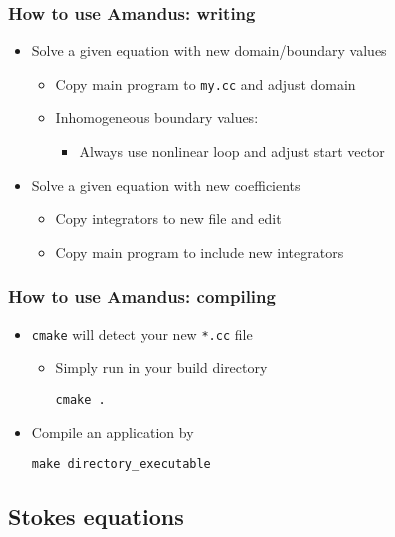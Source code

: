 \begin{frame}
  \frametitle{How to use Amandus: writing}
  \begin{itemize}
  \item Solve a given equation with new domain/boundary values
    \begin{itemize}
    \item Copy main program to \lstinline!my.cc! and adjust domain
    \item Inhomogeneous boundary values:
      \begin{itemize}
      \item Always use nonlinear loop and adjust start vector
      \end{itemize}
    \end{itemize}
  \item Solve a given equation with new coefficients
    \begin{itemize}
    \item Copy integrators to new file and edit
    \item Copy main program to include new integrators
    \end{itemize}
  \end{itemize}
\end{frame}

\begin{frame}
  \frametitle{How to use Amandus: compiling}
  \begin{itemize}
  \item \lstinline!cmake! will detect your new \lstinline!*.cc! file
    \begin{itemize}
    \item Simply run in your build directory
      \begin{block}{}
        \lstinline!cmake .!
      \end{block}
    \end{itemize}
  \item Compile an application by
    \begin{block}{}
      \lstinline!make directory_executable!      
    \end{block}
  \end{itemize}
\end{frame}

\subsection{Stokes equations}
\frame{\tableofcontents[currentsection,subsectionstyle=show/shaded/hide]}

